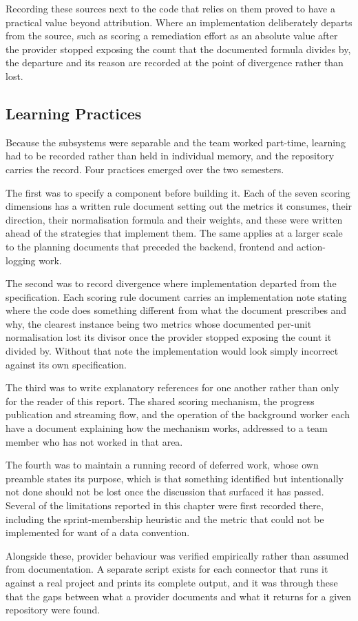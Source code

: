 Recording these sources next to the code that relies on them proved to have a
practical value beyond attribution. Where an implementation deliberately departs
from the source, such as scoring a remediation effort as an absolute value after
the provider stopped exposing the count that the documented formula divides by,
the departure and its reason are recorded at the point of divergence rather than
lost.

\subsection{Learning Practices}
\label{subsec:learning-practices}

Because the subsystems were separable and the team worked part-time, learning had
to be recorded rather than held in individual memory, and the repository carries
the record. Four practices emerged over the two semesters.

The first was to specify a component before building it. Each of the seven
scoring dimensions has a written rule document setting out the metrics it
consumes, their direction, their normalisation formula and their weights, and
these were written ahead of the strategies that implement them. The same applies
at a larger scale to the planning documents that preceded the backend, frontend
and action-logging work.

The second was to record divergence where implementation departed from the
specification. Each scoring rule document carries an implementation note stating
where the code does something different from what the document prescribes and
why, the clearest instance being two metrics whose documented per-unit
normalisation lost its divisor once the provider stopped exposing the count it
divided by. Without that note the implementation would look simply incorrect
against its own specification.

The third was to write explanatory references for one another rather than only
for the reader of this report. The shared scoring mechanism, the progress
publication and streaming flow, and the operation of the background worker each
have a document explaining how the mechanism works, addressed to a team member
who has not worked in that area.

The fourth was to maintain a running record of deferred work, whose own preamble
states its purpose, which is that something identified but intentionally not
done should not be lost once the discussion that surfaced it has passed. Several
of the limitations reported in this chapter were first recorded there, including
the sprint-membership heuristic and the metric that could not be implemented for
want of a data convention.

Alongside these, provider behaviour was verified empirically rather than assumed
from documentation. A separate script exists for each connector that runs it
against a real project and prints its complete output, and it was through these
that the gaps between what a provider documents and what it returns for a given
repository were found.